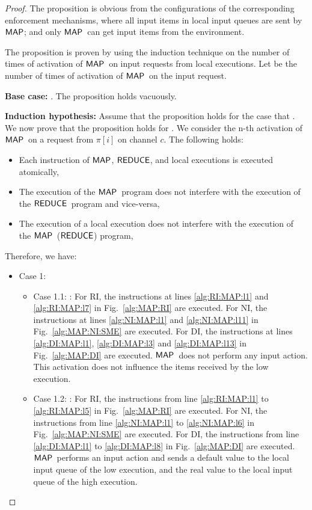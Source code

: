 \documentclass[10pt,a4paper,oneside]{article}
\def\chnl{\ensuremath{c}}
\def\sanserif#1{\ensuremath{\sf #1}}
\def\REDUCE{\ensuremath{\sanserif{REDUCE}}}
\def\MAP{\ensuremath{\sanserif{MAP}}}
\def\Prog{\ensuremath{\pi}}
\def\Progl#1{\ensuremath{\Prog[#1]}}
\begin{document}
\begin{proof}
The proposition is obvious from the configurations of the corresponding enforcement mechanisms, where all input items in local input queues are sent by \MAP; and only \MAP\ can get input items from the environment.

The proposition is proven by using the induction technique on the number of times of activation of \MAP\ on  input requests from local executions. Let  be the number of times of activation of \MAP\ on the input request.

\textbf{Base case:} . The proposition holds vacuously.

\textbf{Induction hypothesis:} Assume that the proposition holds for the case that . We now prove that the proposition holds for . We consider the n-th activation of \MAP\ on a request from \Progl{i} on channel \chnl. The following holds:
\begin{itemize}
\item Each instruction of \MAP, \REDUCE, and local executions is executed atomically,
\item The execution of the \MAP\ program does not interfere with the execution of the \REDUCE\ program and vice-versa,
\item The execution of a local execution does not interfere with the execution of the \MAP\ (\REDUCE) program,
\end{itemize} Therefore, we have:


\begin{itemize}
\item Case 1: 		
	\begin{itemize}
	\item Case 1.1: : For RI, the instructions at lines \ref{alg:RI:MAP:l1} and \ref{alg:RI:MAP:l7} in Fig.~\ref{alg:MAP:RI} are executed. For NI, the instructions at lines \ref{alg:NI:MAP:l1} and \ref{alg:NI:MAP:l11} in Fig.~\ref{alg:MAP:NI:SME} are executed. For DI, the instructions at lines \ref{alg:DI:MAP:l1}, \ref{alg:DI:MAP:l3} and \ref{alg:DI:MAP:l13} in Fig.~\ref{alg:MAP:DI} are executed. \MAP\ does not perform any input action. This activation does not influence the items received by the low execution.
	\item Case 1.2: : For RI, the instructions from line \ref{alg:RI:MAP:l1} to \ref{alg:RI:MAP:l5} in Fig.~\ref{alg:MAP:RI} are executed. For NI, the instructions from line \ref{alg:NI:MAP:l1} to \ref{alg:NI:MAP:l6} in Fig.~\ref{alg:MAP:NI:SME} are executed. For DI, the instructions from line \ref{alg:DI:MAP:l1} to \ref{alg:DI:MAP:l8} in Fig.~\ref{alg:MAP:DI} are executed. \MAP\ performs an input action and sends a default value to the local input queue of the low execution, and the real value to the local input queue of the high execution.
	\end{itemize}



\end{itemize}
\end{proof}
\end{document}
